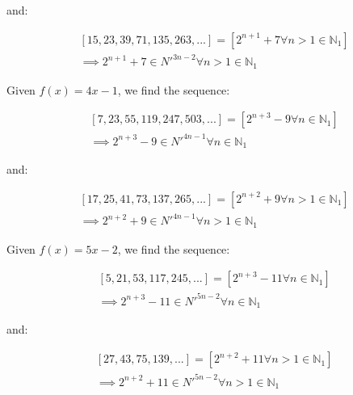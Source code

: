 \documentclass{article}
\begin{document}
\noindent
and:

\begin{displaymath}\begin{aligned}
& [15, 23, 39, 71, 135, 263, ...] = [2^{n+1}+7 \forall n>1 \in \mathbb{N}_{1}] \\
& \implies 2^{n+1}+7 \in N'^{3n-2} \forall n>1 \in \mathbb{N}_{1}
\end{aligned}\end{displaymath}

\noindent
Given \begin{math}f(x)=4x-1\end{math}, we find the sequence:

\begin{displaymath}\begin{aligned}
& [7, 23, 55, 119, 247, 503, ...] = [2^{n+3}-9 \forall n \in \mathbb{N}_{1}] \\
& \implies 2^{n+3}-9 \in N'^{4n-1} \forall n \in \mathbb{N}_{1}
\end{aligned}\end{displaymath}

\noindent
and:

\begin{displaymath}\begin{aligned}
& [17, 25, 41, 73, 137, 265, ...] = [2^{n+2}+9 \forall n>1 \in \mathbb{N}_{1}] \\
& \implies 2^{n+2}+9 \in N'^{4n-1} \forall n>1 \in \mathbb{N}_{1}
\end{aligned}\end{displaymath}

\noindent
Given \begin{math}f(x)=5x-2\end{math}, we find the sequence:

\begin{displaymath}\begin{aligned}
& [5, 21, 53, 117, 245, ...] = [2^{n+3}-11 \forall n \in \mathbb{N}_{1}] \\
& \implies 2^{n+3}-11 \in N'^{5n-2} \forall n \in \mathbb{N}_{1}
\end{aligned}\end{displaymath}

\noindent
and:

\begin{displaymath}\begin{aligned}
& [27, 43, 75, 139, ...] = [2^{n+2}+11 \forall n>1 \in \mathbb{N}_{1}] \\
& \implies 2^{n+2}+11 \in N'^{5n-2} \forall n>1 \in \mathbb{N}_{1}
\end{aligned}\end{displaymath}
\end{document}
